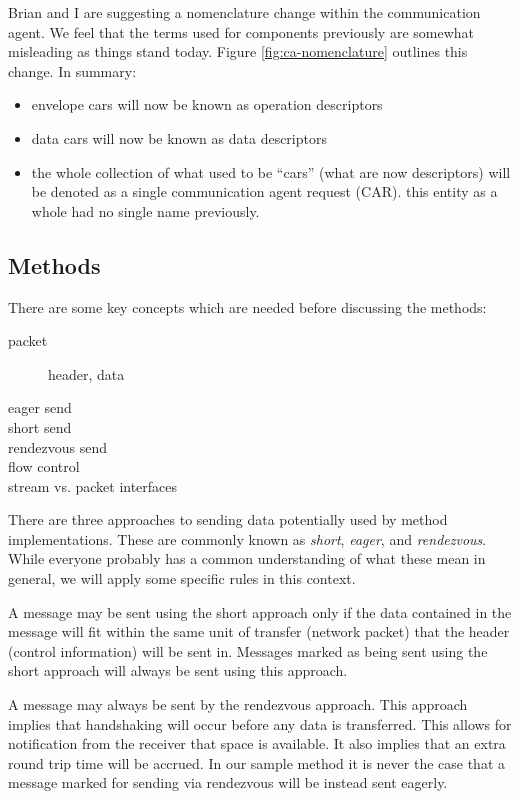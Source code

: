 \documentclass[11pt,letterpaper]{article}
\begin{document}
Brian and I are suggesting a nomenclature change within the communication
agent.  We feel that the terms used for components previously are somewhat
misleading as things stand today.  Figure \ref{fig:ca-nomenclature} outlines
this change.  In summary:
\begin{itemize}
\item envelope cars will now be known as operation descriptors
\item data cars will now be known as data descriptors
\item the whole collection of what used to be ``cars'' (what are now
  descriptors) will be denoted as a single communication agent request (CAR).
  this entity as a whole had no single name previously.
\end{itemize}

\subsection{Methods}

There are some key concepts which are needed before discussing the methods:
\begin{description}
\item[packet] header, data
\item[eager send]
\item[short send]
\item[rendezvous send]
\item[flow control]
\item[stream vs. packet interfaces]
\end{description}

There are three approaches to sending data potentially used by method
implementations.  These are commonly known as \emph{short}, \emph{eager}, and
\emph{rendezvous}.  While everyone probably has a common understanding of what
these mean in general, we will apply some specific rules in this context.

A message may be sent using the short approach only if the data contained in
the message will fit within the same unit of transfer (network packet) that the
header (control information) will be sent in.  Messages marked as being sent
using the short approach will always be sent using this approach.

A message may always be sent by the rendezvous approach.  This approach implies
that handshaking will occur before any data is transferred.  This allows for
notification from the receiver that space is available.  It also implies that
an extra round trip time will be accrued.  In our sample method it is never the
case that a message marked for sending via rendezvous will be instead sent
eagerly.
\end{document}
